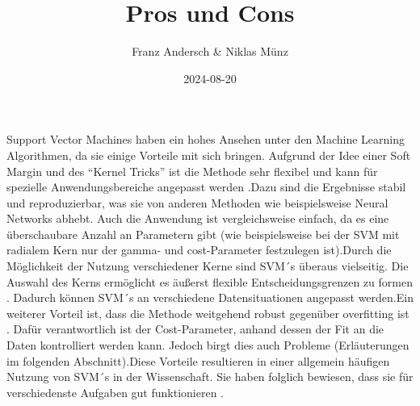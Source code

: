 \documentclass[
]{article}
\title{Pros und Cons}
\author{Franz Andersch \& Niklas Münz}
\date{2024-08-20}
\renewcommand{\maketitle}{}
\begin{document}
\maketitle

Support Vector Machines haben ein hohes Ansehen unter den Machine
Learning Algorithmen, da sie einige Vorteile mit sich bringen. Aufgrund
der Idee einer Soft Margin und des ``Kernel Tricks'' ist die Methode
sehr flexibel und kann für spezielle Anwendungsbereiche angepasst werden
\parencite{bennettSupportVectorMachines2000}.Dazu sind die Ergebnisse
stabil und reproduzierbar, was sie von anderen Methoden wie
beispielsweise Neural Networks abhebt. Auch die Anwendung ist
vergleichsweise einfach, da es eine überschaubare Anzahl an Parametern
gibt (wie beispielsweise bei der SVM mit radialem Kern nur der gamma-
und cost-Parameter festzulegen ist).\newline Durch die Möglichkeit der
Nutzung verschiedener Kerne sind SVM´s überaus vielseitig. Die Auswahl
des Kerns ermöglicht es äußerst flexible Entscheidungsgrenzen zu formen
\parencite{kuhnAppliedPredictiveModeling2013}. Dadurch können SVM´s an
verschiedene Datensituationen angepasst werden.\newline Ein weiterer
Vorteil ist, dass die Methode weitgehend robust gegenüber overfitting
ist \parencite{kuhnAppliedPredictiveModeling2013}. Dafür verantwortlich
ist der Cost-Parameter, anhand dessen der Fit an die Daten kontrolliert
werden kann. Jedoch birgt dies auch Probleme (Erläuterungen im folgenden
Abschnitt).\newline Diese Vorteile resultieren in einer allgemein
häufigen Nutzung von SVM´s in der Wissenschaft. Sie haben folglich
bewiesen, dass sie für verschiedenste Aufgaben gut funktionieren
\parencite{kuhnAppliedPredictiveModeling2013}.
\end{document}

